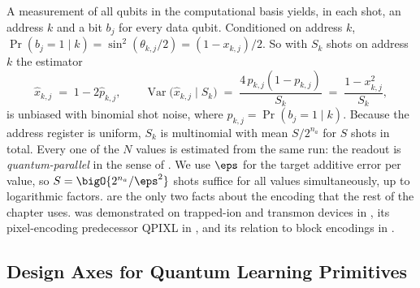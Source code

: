 A measurement of all qubits in the computational basis yields, in each shot, an address $k$ and a bit $b_j$ for every data qubit. Conditioned on address $k$, $\Pr(b_j = 1 \mid k) = \sin^2(\theta_{k,j}/2) = (1 - x_{k,j})/2$. So with $S_k$ shots on address $k$ the estimator
\begin{equation}\label{eq:qml:readout}
\hat{x}_{k,j} \;=\; 1 - 2\hat{p}_{k,j}, \qquad
\operatorname{Var}\big(\hat{x}_{k,j} \mid S_k\big) \;=\; \frac{4\,p_{k,j}(1-p_{k,j})}{S_k} \;=\; \frac{1 - x_{k,j}^2}{S_k},
\end{equation}
is unbiased with binomial shot noise, where $p_{k,j} = \Pr(b_j = 1 \mid k)$. Because the address register is uniform, $S_k$ is multinomial with mean $S/2^{n_a}$ for $S$ shots in total. Every one of the $N$ values is estimated from the same run: the readout is \emph{quantum-parallel} in the sense of \cite{balewski2024qcrank}. We use $\eps$ for the target additive error per value, so $S = \bigO{2^{n_a}/\eps^2}$ shots suffice for all values simultaneously, up to logarithmic factors.  are the only two facts about the encoding that the rest of the chapter uses. \qcrank{} was demonstrated on trapped-ion and transmon devices in \cite{balewski2024qcrank}, its pixel-encoding predecessor QPIXL in \cite{amankwah2022qpixl}, and its relation to block encodings in \cite{camps2022fable}.

\subsection{Design Axes for Quantum Learning Primitives}\label{sec:qml:prelim:axes}

